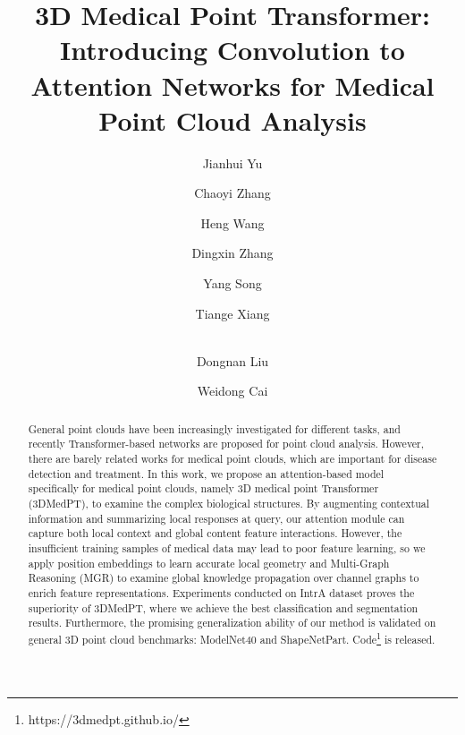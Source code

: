 \documentclass[10pt,twocolumn,letterpaper]{article}
\begin{document}
\title{3D Medical Point Transformer: Introducing Convolution to Attention Networks for Medical Point Cloud Analysis}

\author[1]{Jianhui Yu}
\author[1]{Chaoyi Zhang}
\author[1]{Heng Wang}
\author[1]{Dingxin Zhang}
\author[2]{Yang Song}
\author[1]{Tiange Xiang}
\author[1]{\\Dongnan Liu}
\author[1]{Weidong Cai}



\maketitle
\ificcvfinal\thispagestyle{empty}\fi

\begin{abstract}
General point clouds have been increasingly investigated for different tasks, and recently Transformer-based networks are proposed for point cloud analysis.
However, there are barely related works for medical point clouds, which are important for disease detection and treatment.
In this work, we propose an attention-based model specifically for medical point clouds, namely 3D medical point Transformer (3DMedPT), to examine the complex biological structures.
By augmenting contextual information and summarizing local responses at query, our attention module can capture both local context and global content feature interactions.
However, the insufficient training samples of medical data may lead to poor feature learning, so we apply position embeddings to learn accurate local geometry and Multi-Graph Reasoning (MGR) to examine global knowledge propagation over channel graphs to enrich feature representations.
Experiments conducted on IntrA dataset proves the superiority of 3DMedPT, where we achieve the best classification and segmentation results.
Furthermore, the promising generalization ability of our method is validated on general 3D point cloud benchmarks: ModelNet40 and ShapeNetPart.
Code\footnote[1]{https://3dmedpt.github.io/} is released.
\end{abstract}
\end{document}
